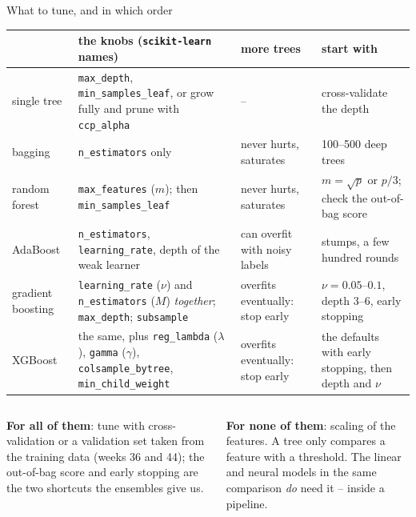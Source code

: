 \documentclass[10pt,aspectratio=169]{beamer}
\begin{document}
\begin{frame}{What to tune, and in which order}
\centering
\scriptsize
\setlength{\tabcolsep}{4pt}
\begin{tabular}{@{}L{2.1cm}L{4.5cm}L{3.0cm}L{3.6cm}@{}}
\toprule
 & the knobs (\texttt{scikit-learn} names) & more trees & start with\\
\midrule
single tree & \texttt{max\_depth}, \texttt{min\_samples\_leaf}, or grow fully and prune
  with \texttt{ccp\_alpha} & -- & cross-validate the depth\\
\addlinespace[1.5pt]
bagging & \texttt{n\_estimators} only & never hurts, saturates & 100--500 deep trees\\
\addlinespace[1.5pt]
random forest & \texttt{max\_features} ($m$); then \texttt{min\_samples\_leaf} &
  never hurts, saturates & $m=\sqrt p$ or $p/3$; check the out-of-bag score\\
\addlinespace[1.5pt]
AdaBoost & \texttt{n\_estimators}, \texttt{learning\_rate}, depth of the weak learner &
  can overfit with noisy labels & stumps, a few hundred rounds\\
\addlinespace[1.5pt]
gradient boosting & \texttt{learning\_rate} ($\nu$) and \texttt{n\_estimators} ($M$)
  \emph{together}; \texttt{max\_depth}; \texttt{subsample} & overfits eventually: stop early &
  $\nu=0.05$--$0.1$, depth 3--6, early stopping\\
\addlinespace[1.5pt]
XGBoost & the same, plus \texttt{reg\_lambda} ($\lambda$), \texttt{gamma} ($\gamma$),
  \texttt{colsample\_bytree}, \texttt{min\_child\_weight} & overfits eventually: stop early &
  the defaults with early stopping, then depth and $\nu$\\
\bottomrule
\end{tabular}

\bigskip
\small
\begin{columns}[T]
\begin{column}{0.48\textwidth}
\textbf{For all of them}: tune with cross-validation or a validation set
taken from the training data (weeks 36 and 44); the out-of-bag score and
early stopping are the two shortcuts the ensembles give us.
\end{column}
\begin{column}{0.48\textwidth}
\textbf{For none of them}: scaling of the features.  A tree only compares a
feature with a threshold.  The linear and neural models in the same
comparison \emph{do} need it -- inside a pipeline.
\end{column}
\end{columns}
\end{frame}
\end{document}
